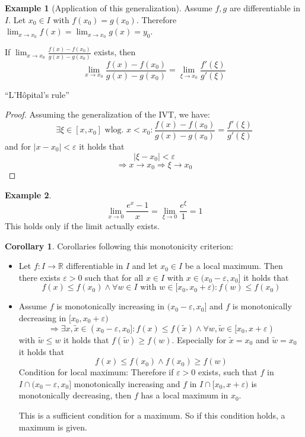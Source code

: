 \documentclass[a4paper,landscape,twocolumn]{article}
\theoremstyle{definition}
\newtheorem{ex}{Example}
\newtheorem{cor}{Corollary}
\newcommand\abs[1]{\left|#1\right|}
\begin{document}
\begin{ex}[Application of this generalization]
  Assume $f,g$ are differentiable in $I$. Let $x_0 \in I$ with $f(x_0) = g(x_0)$.
  Therefore $\lim_{x\to x_0} f(x) = \lim_{x\to x_0} g(x) = y_0$.

  If $\lim_{x\to x_0} \frac{f(x) - f(x_0)}{g(x) - g(x_0)}$ exists, then
  \[ \lim_{x\to x_0} \frac{f(x) - f(x_0)}{g(x) - g(x_0)} = \lim_{\xi \to x_0} \frac{f'(\xi)}{g'(\xi)} \]
  \begin{center}
    \enquote{L'Hôpital's rule}
  \end{center}
\end{ex}
\begin{proof}
  Assuming the generalization of the IVT, we have:
  \[ \exists \xi \in [x, x_0] \text{ wlog. } x < x_0: \frac{f(x) - f(x_0)}{g(x) - g(x_0)} = \frac{f'(\xi)}{g'(\xi)} \]
  and for $\abs{x - x_0} < \varepsilon$ it holds that
  \[ \abs{\xi - x_0} < \varepsilon \]
  \[ \Rightarrow x \to x_0 \Rightarrow \xi \to x_0 \]
\end{proof}
\begin{ex}
  \[ \lim_{x\to 0} \frac{e^x - 1}{x} = \lim_{\xi \to 0} \frac{e^\xi}{1} = 1 \]
  This holds only if the limit actually exists.
\end{ex}
\begin{cor}
  Corollaries following this monotonicity criterion:
  \begin{itemize}
    \item Let $f: I \to \mathbb R$ differentiable in $I$ and let $x_0 \in I$ be a local maximum.
      Then there exists $\varepsilon > 0$ such that for all $x \in I$ with $x \in
      (x_0 - \varepsilon, x_0]$ it holds that
      \[ f(x) \leq f(x_0) \land \forall w \in I \text{ with } w \in [x_0, x_0 + \varepsilon): f(w) \leq f(x_0) \]
    \item Assume $f$ is monotonically increasing in $(x_0 - \varepsilon, x_0]$ and $f$ is monotonically decreasing
      in $[x_0, x_0 + \varepsilon)$
      \[ \Rightarrow \exists x, \tilde{x} \in (x_0 - \varepsilon, x_0]: f(x) \leq f(\tilde{x}) \land \forall w, \tilde{w} \in [x_0, x + \varepsilon) \]
      with $\tilde{w} \leq w$ it holds that $f(\tilde{w}) \geq f(w)$.
      Especially for $\tilde{x} = x_0$ and $\tilde{w} = x_0$ it holds that
      \[ f(x) \leq f(x_0) \land f(x_0) \geq f(w) \]
      Condition for local maximum: Therefore if $\varepsilon > 0$ exists,
      such that $f$ in $I \cap (x_0 - \varepsilon, x_0]$ monotonically increasing
      and $f$ in $I \cap [x_0, x + \varepsilon)$ is monotonically decreasing,
      then $f$ has a local maximum in $x_0$.

      This is a sufficient condition for a maximum. So if this condition holds,
      a maximum is given.
  \end{itemize}
\end{cor}
\end{document}
